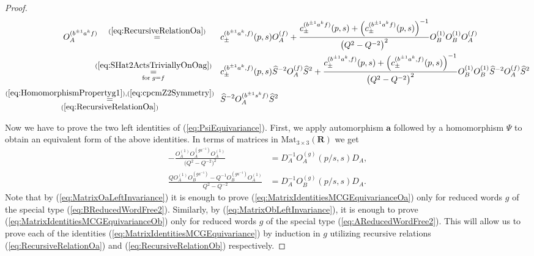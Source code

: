 \documentclass{amsart}
\begin{document}
\begin{proof}
\begin{align*}
O_A^{(b^{\pm1}a^kf)}\quad\overset{(\ref{eq:RecursiveRelationOa})}{=}\quad\;\;\,&c_{\pm}^{(b^{\pm1}a^k,f)}(p,s)O_A^{(f)}+\frac{c_{\pm}^{(b^{\pm1}a^kf)}(p,s)+\left(c_{\pm}^{(b^{\pm1}a^kf)}(p,s)\right)^{-1}}{\big(Q^2-Q^{-2}\big)^2}O_B^{(1)}O_B^{(1)}O_A^{(f)}\\
\overset{(\ref{eq:SHat2ActsTriviallyOnOag})}{\underset{\textrm{for}\;g=f}{=}}\quad&c_{\pm}^{(b^{\pm1}a^k,f)}(p,s)\widehat S^{-2}O_A^{(f)}\widehat S^2+\frac{c_{\pm}^{(b^{\pm1}a^k,f)}(p,s)+\left(c_{\pm}^{(b^{\pm1}a^k,f)}(p,s)\right)^{-1}}{\big(Q^2-Q^{-2}\big)^2}O_B^{(1)}O_B^{(1)}\widehat S^{-2}O_A^{(f)}\widehat S^2\\
\overset{(\ref{eq:HomomorphismPropertyg1}),(\ref{eq:cpcmZ2Symmetry})}{\underset{(\ref{eq:RecursiveRelationOa})}{=}}\;\;\,&\widehat S^{-2}O_A^{(b^{\pm1}s^kf)}\widehat S^2
\end{align*}

Now we have to prove the two left identities of (\ref{eq:PsiEquivariance}). First, we apply automorphism $\mathbf a$ followed by a homomorphism $\Psi$ to obtain an equivalent form of the above identities. In terms of matrices in $\mathrm{Mat_{3\times3}}(\mathbf R)$ we get
\begin{subequations}
\begin{align}
-\frac{O_A^{(1)}O_A^{(ga^{-1})}O_A^{(1)}}{\big(Q^2-Q^{-2}\big)^2}&=D_A^{-1}O_A^{(g)}(p/s,s)D_A,
\label{eq:MatrixIdentitiesMCGEquivarianceOa}\\
\frac{QO_A^{(1)}O_B^{(ga^{-1})}-Q^{-1}O_B^{(ga^{-1})}O_A^{(1)}}{Q^2-Q^{-2}}&=D_A^{-1}O_B^{(g)}(p/s,s)D_A.
\label{eq:MatrixIdentitiesMCGEquivarianceOb}
\end{align}
\label{eq:MatrixIdentitiesMCGEquivariance}
\end{subequations}
Note that by (\ref{eq:MatrixOaLeftInvariance}) it is enough to prove (\ref{eq:MatrixIdentitiesMCGEquivarianceOa}) only for reduced words $g$ of the special type (\ref{eq:BReducedWordFree2}). Similarly, by (\ref{eq:MatrixObLeftInvariance}), it is enough to prove (\ref{eq:MatrixIdentitiesMCGEquivarianceOb}) only for reduced words $g$ of the special type (\ref{eq:AReducedWordFree2}). This will allow us to prove each of the identities (\ref{eq:MatrixIdentitiesMCGEquivariance}) by induction in $g$ utilizing recursive relations (\ref{eq:RecursiveRelationOa}) and (\ref{eq:RecursiveRelationOb}) respectively.


\end{proof}
\end{document}
